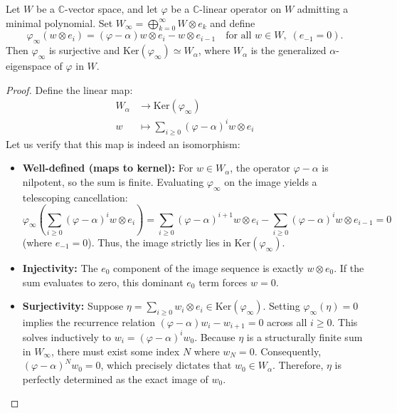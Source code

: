 \begin{lemma}\label{lem:the_linear_operator_in_colimit}
    Let $W$ be a $\mathbb{C}$-vector space, and let $\varphi$ be a $\mathbb{C}$-linear operator on $W$ admitting a minimal polynomial.
    Set $W_{\infty} = \bigoplus_{k=0}^{\infty} W \otimes e_k$ and define $$\varphi_{\infty}(w \otimes e_i) = (\varphi - \alpha)w \otimes e_i - w \otimes e_{i-1} \quad \text{for all }  w \in W, \; (e_{-1} = 0).$$Then $\varphi_{\infty}$
    is surjective and $\mathrm{Ker}(\varphi_{\infty}) \simeq W_{\alpha}$, where $W_{\alpha}$ is the generalized $\alpha$-eigenspace of $\varphi$ in $W$.
\end{lemma}
\begin{proof}
    Define the linear map:
    \begin{equation}
        \begin{aligned}\label{eq:alpha_eigenspace_map}
            W_{\alpha} & \longrightarrow \mathrm{Ker}(\varphi_{\infty})                               \\
            w          & \longmapsto \sum\limits_{i \geqslant 0} (\varphi - \alpha)^i w \otimes e_{i}
        \end{aligned}
    \end{equation}
    Let us verify that this map is indeed an isomorphism:
    \begin{itemize}
        \item \textbf{Well-defined (maps to kernel):} For $w \in W_\alpha$, the operator $\varphi-\alpha$ is nilpotent, so the sum is finite. Evaluating $\varphi_\infty$ on the image yields a telescoping cancellation:
              \[
                  \varphi_{\infty} \left( \sum_{i \geqslant 0} (\varphi-\alpha)^i w \otimes e_i \right) = \sum_{i \geqslant 0} (\varphi-\alpha)^{i+1} w \otimes e_i - \sum_{i \geqslant 0} (\varphi-\alpha)^i w \otimes e_{i-1} = 0
              \]
              (where $e_{-1}=0$). Thus, the image strictly lies in $\mathrm{Ker}(\varphi_{\infty})$.
        \item \textbf{Injectivity:} The $e_0$ component of the image sequence is exactly $w \otimes e_0$. If the sum evaluates to zero, this dominant $e_0$ term forces $w=0$.
        \item \textbf{Surjectivity:} Suppose $\eta = \sum_{i \geqslant 0} w_i \otimes e_i \in \mathrm{Ker}(\varphi_\infty)$. Setting $\varphi_\infty(\eta) = 0$ implies the recurrence relation $(\varphi-\alpha) w_{i} - w_{i+1} = 0$ across all $i \geqslant 0$. This solves inductively to $w_{i} = (\varphi-\alpha)^i w_0$. Because $\eta$ is a structurally finite sum in $W_\infty$, there must exist some index $N$ where $w_N = 0$. Consequently, $(\varphi-\alpha)^N w_0 = 0$, which precisely dictates that $w_0 \in W_\alpha$. Therefore, $\eta$ is perfectly determined as the exact image of $w_0$.
    \end{itemize}


\end{proof}
